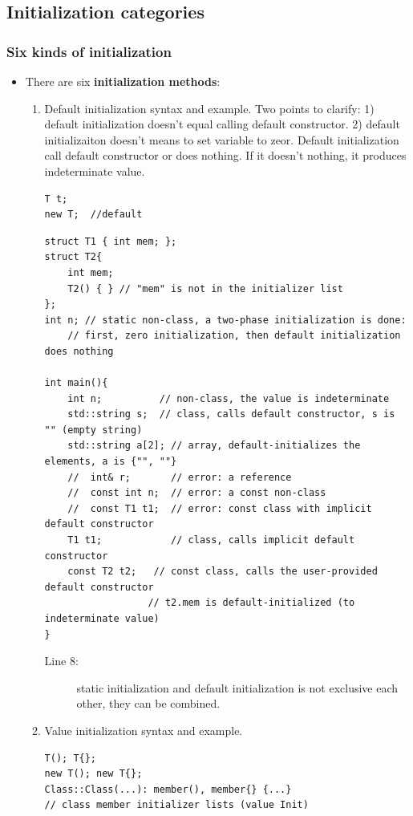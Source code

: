 \documentclass[a4paper,11pt,twoside]{book}
\begin{document}
\subsection{Initialization  categories}

\subsubsection{Six kinds of initialization}
\begin{itemize}
	\item There are six \textbf{initialization methods}:
	\begin{enumerate}
		\item Default initialization syntax and example. Two points to clarify: 1) default initialization doesn't equal calling default constructor. 2) default initializaiton doesn't means to set variable to zeor. Default initialization call default constructor or does nothing. If it doesn't nothing, it produces indeterminate value.
\begin{lstlisting}[numbers=none]
T t;
new T;  //default
\end{lstlisting}

	
\begin{lstlisting}
struct T1 { int mem; };
struct T2{
	int mem;
	T2() { } // "mem" is not in the initializer list
};
int n; // static non-class, a two-phase initialization is done:
	// first, zero initialization, then default initialization does nothing
	
int main(){
	int n;          // non-class, the value is indeterminate
	std::string s;  // class, calls default constructor, s is "" (empty string)
	std::string a[2]; // array, default-initializes the elements, a is {"", ""}
	//  int& r;       // error: a reference
	//  const int n;  // error: a const non-class
	//  const T1 t1;  // error: const class with implicit default constructor
	T1 t1;            // class, calls implicit default constructor
	const T2 t2;   // const class, calls the user-provided default constructor
                  // t2.mem is default-initialized (to indeterminate value)
}
\end{lstlisting}

\begin{description}
	\item[Line 8:] static initialization and default initialization is not exclusive each other, they can be combined. 
\end{description}


		\item Value initialization syntax and example.
\begin{lstlisting}[numbers=none]
T(); T{};
new T(); new T{};
Class::Class(...): member(), member{} {...} 
// class member initializer lists (value Init)
\end{lstlisting}



\end{enumerate}
\end{itemize}
\end{document}
